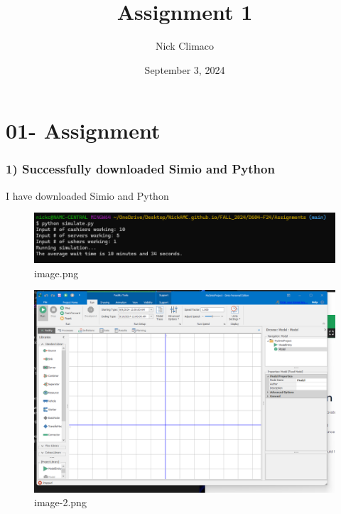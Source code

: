 \documentclass[
  11pt,
]{article}
\title{Assignment 1}
\author{Nick Climaco}
\date{September 3, 2024}
\renewcommand*\contentsname{Table of contents}
\newcommand\contentsname{Table of contents}
\begin{document}
\maketitle

\renewcommand*\contentsname{Table of contents}
{
\hypersetup{linkcolor=}
\setcounter{tocdepth}{3}
\tableofcontents
}
\newpage

\section{01- Assignment}\label{assignment}

\subsubsection{1) Successfully downloaded Simio and
Python}\label{successfully-downloaded-simio-and-python}

I have downloaded Simio and Python

\begin{figure}[H]

{\centering \includegraphics{01-assignment_files/figure-pdf/cell-3-2-image.png}

}

\caption{image.png}

\end{figure}%
\begin{figure}[H]

{\centering \includegraphics{01-assignment_files/figure-pdf/cell-3-1-image-2.png}

}

\caption{image-2.png}

\end{figure}%
\end{document}
